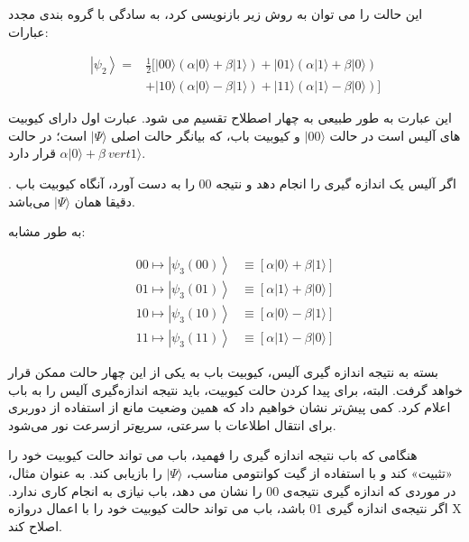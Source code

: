 \documentclass{book}
\begin{document}
این حالت را می توان به روش زیر بازنویسی کرد، به سادگی با گروه بندی مجدد عبارات:

\begin{center}
	$$\begin{aligned}
		\left|\psi_2\right\rangle= & \frac{1}{2}[|00\rangle(\alpha|0\rangle+\beta|1\rangle)+|01\rangle(\alpha|1\rangle+\beta|0\rangle) \\
		& +|10\rangle(\alpha|0\rangle-\beta|1\rangle)+|11\rangle(\alpha|1\rangle-\beta|0\rangle)]
	\end{aligned}$$
\end{center}


این عبارت به طور طبیعی به چهار اصطلاح تقسیم می شود. عبارت اول دارای کیوبیت های آلیس است
در حالت $\vert 00 \rangle$ و کیوبیت باب، که بیانگر حالت اصلی $\vert \Psi \rangle$ است؛ در حالت     $\alpha \vert 0 \rangle + \beta \ vert 1 \rangle$  قرار دارد.


. اگر آلیس یک اندازه گیری را انجام دهد و نتیجه 00 را به دست آورد، آنگاه کیوبیت باب دقیقا همان $\vert \Psi \rangle$ می‌باشد.


 به طور مشابه:
\begin{center}
	$$\begin{aligned}
		00 \longmapsto\left|\psi_3(00)\right\rangle & \equiv[\alpha|0\rangle+\beta|1\rangle] \\
		01 \longmapsto\left|\psi_3(01)\right\rangle & \equiv[\alpha|1\rangle+\beta|0\rangle] \\
		10 \longmapsto\left|\psi_3(10)\right\rangle & \equiv[\alpha|0\rangle-\beta|1\rangle] \\
		11 \longmapsto\left|\psi_3(11)\right\rangle & \equiv[\alpha|1\rangle-\beta|0\rangle]
	\end{aligned}$$
\end{center}

بسته به نتیجه اندازه گیری آلیس، کیوبیت باب به یکی از این چهار حالت ممکن قرار خواهد گرفت. البته، برای پیدا کردن حالت کیوبیت، باید نتیجه اندازه‌گیری آلیس را به باب اعلام کرد.
کمی پیش‌‌تر نشان خواهیم داد که همین وضعیت مانع از استفاده از دوربری برای انتقال اطلاعات با سرعتی، سریع‌تر ازسرعت نور می‌شود.



هنگامی که باب نتیجه اندازه گیری را فهمید، باب می تواند حالت کیوبیت خود را «تثبیت» کند و با استفاده از گیت کوانتومی مناسب، $\vert \Psi \rangle$ را بازیابی کند. به عنوان مثال، در موردی که اندازه گیری نتیجه‌ی 00 را نشان می دهد، باب نیازی به انجام کاری ندارد. اگر نتیجه‌ی اندازه گیری 01 باشد، باب می تواند حالت کیوبیت خود را با اعمال دروازه X اصلاح کند.
\end{document}
